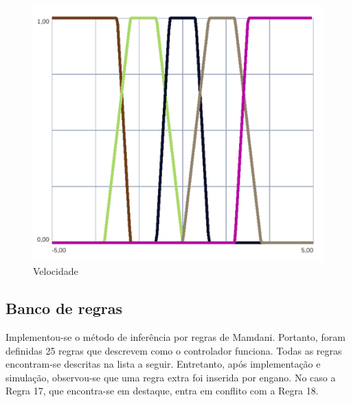 \begin{itemize}
            \begin{figure}[H] 
                \centering
                \includegraphics[scale=0.5]{imagens/out_velocidade.png}
                \caption{Velocidade}
            \end{figure}

    \end{itemize}
    \subsection{Banco de regras}
        Implementou-se o método de inferência por regras de Mamdani. Portanto, foram definidas 25 regras que descrevem como o controlador funciona. Todas as regras encontram-se descritas na lista a seguir. 
        Entretanto, após implementação e simulação, observou-se que uma regra extra foi inserida por engano. No caso a Regra 17, que encontra-se em destaque, entra em conflito com a Regra 18.

